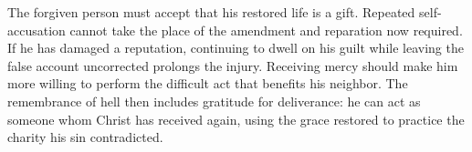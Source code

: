 The forgiven person must accept that his restored life is a gift. Repeated self-accusation cannot take the place of the amendment and reparation now required. If he has damaged a reputation, continuing to dwell on his guilt while leaving the false account uncorrected prolongs the injury. Receiving mercy should make him more willing to perform the difficult act that benefits his neighbor. The remembrance of hell then includes gratitude for deliverance: he can act as someone whom Christ has received again, using the grace restored to practice the charity his sin contradicted.

